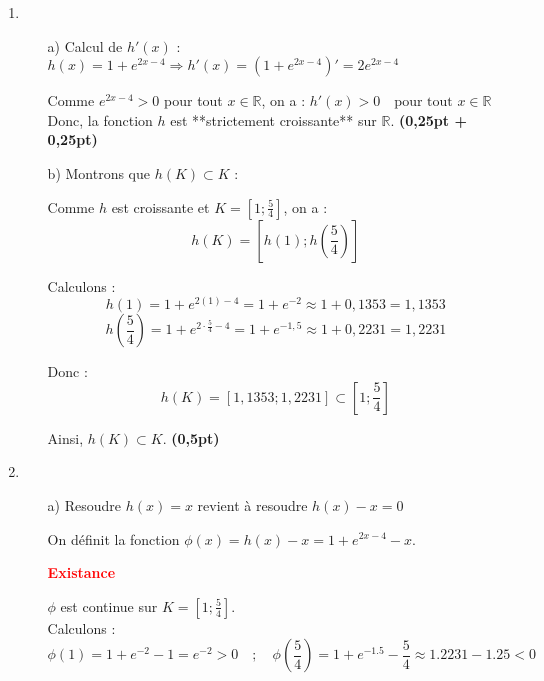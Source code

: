 \documentclass[12pt,a4paper]{article}
\begin{document}
\begin{enumerate}
    \item
          \begin{enumerate}
              \item[a)] Calcul de \( h'(x) \) :
                  \(
                  h(x) = 1 + e^{2x - 4} \Rightarrow h'(x) =  \left(1 + e^{2x - 4} \right)' = 2e^{2x - 4}
                  \)

                  Comme \( e^{2x - 4} > 0 \) pour tout \( x \in \mathbb{R} \), on a :
                  \(
                  h'(x) > 0 \quad \text{pour tout } x \in \mathbb{R}
                  \)
                  Donc, la fonction \( h \) est **strictement croissante** sur \( \mathbb{R} \). \hfill \textbf{(0,25pt + 0,25pt)}

              \item[b)] Montrons que \( h(K) \subset K \) :

                  Comme \( h \) est croissante et \( K = \left[1 ; \frac{5}{4}\right] \), on a :
                  \[
                      h(K) = \left[ h(1) ; h\left(\frac{5}{4}\right) \right]
                  \]

                  Calculons :
                  \[
                      h(1) = 1 + e^{2(1) - 4} = 1 + e^{-2} \approx 1 + 0{,}1353 = 1{,}1353
                  \]
                  \[
                      h\left(\frac{5}{4}\right) = 1 + e^{2 \cdot \frac{5}{4} - 4} = 1 + e^{-1{,}5} \approx 1 + 0{,}2231 = 1{,}2231
                  \]

                  Donc :
                  \[
                      h(K) = \left[1{,}1353 ; 1{,}2231\right] \subset \left[1 ; \frac{5}{4}\right]
                  \]

                  Ainsi, \( h(K) \subset K \). \hfill \textbf{(0,5pt)}
          \end{enumerate}
    \item
          \begin{enumerate}
              \item[a)] Resoudre \( h(x) = x \)  revient à resoudre \( h(x) - x = 0 \)

                  On définit la fonction \( \phi(x) = h(x) - x = 1 + e^{2x - 4} - x \).

                  \textcolor{red}{\textbf{Existance}}

                  \( \phi \) est continue sur \( K = \left[1 ; \frac{5}{4} \right] \).\\
                  Calculons :
                  \[
                      \phi(1) = 1 + e^{-2} - 1 = e^{-2} > 0 \quad ; \quad \phi\left( \frac{5}{4} \right) = 1 + e^{-1.5} - \frac{5}{4} \approx 1.2231 - 1.25 < 0
                  \]


\end{enumerate}
\end{enumerate}
\end{document}

